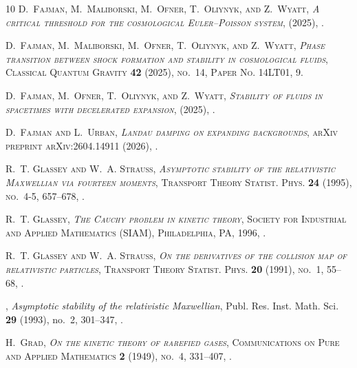 \documentclass[reqno]{amsart}
\theoremstyle{definition}
\numberwithin{equation}{section}
\numberwithin{theorem}{section}
\begin{document}
\begin{thebibliography}{10}
\bgroup\scshape{}D.~Fajman\egroup{}, \bgroup\scshape{}M.~Maliborski\egroup{}, \bgroup\scshape{}M.~Ofner\egroup{}, \bgroup\scshape{}T.~Oliynyk\egroup{}, and \bgroup\scshape{}Z.~Wyatt\egroup{}, \emph{A critical threshold for the cosmological {E}uler--{P}oisson system},  (2025), .

\bgroup\scshape{}D.~Fajman\egroup{}, \bgroup\scshape{}M.~Maliborski\egroup{}, \bgroup\scshape{}M.~Ofner\egroup{}, \bgroup\scshape{}T.~Oliynyk\egroup{}, and \bgroup\scshape{}Z.~Wyatt\egroup{}, \emph{Phase transition between shock formation and stability in cosmological fluids}, Classical Quantum Gravity \textbf{42} (2025), no.~14, Paper No. 14LT01, 9.

\bgroup\scshape{}D.~Fajman\egroup{}, \bgroup\scshape{}M.~Ofner\egroup{}, \bgroup\scshape{}T.~Oliynyk\egroup{}, and \bgroup\scshape{}Z.~Wyatt\egroup{}, \emph{Stability of fluids in spacetimes with decelerated expansion},  (2025), .

\bgroup\scshape{}D.~Fajman\egroup{} and \bgroup\scshape{}L.~Urban\egroup{}, \emph{Landau damping on expanding backgrounds}, arXiv preprint arXiv:2604.14911 (2026), .

\bgroup\scshape{}R.~T. Glassey\egroup{} and \bgroup\scshape{}W.~A. Strauss\egroup{}, \emph{Asymptotic stability of the relativistic {M}axwellian via fourteen moments}, Transport Theory Statist. Phys. \textbf{24} (1995), no.~4-5, 657--678, .

\bgroup\scshape{}R.~T. Glassey\egroup{}, \emph{The {C}auchy problem in kinetic theory}, Society for Industrial and Applied Mathematics (SIAM), Philadelphia, PA, 1996, .

\bgroup\scshape{}R.~T. Glassey\egroup{} and \bgroup\scshape{}W.~A. Strauss\egroup{}, \emph{On the derivatives of the collision map of relativistic particles}, Transport Theory Statist. Phys. \textbf{20} (1991), no.~1, 55--68, .

\bysame, \emph{Asymptotic stability of the relativistic {M}axwellian}, Publ. Res. Inst. Math. Sci. \textbf{29} (1993), no.~2, 301--347, .

\bgroup\scshape{}H.~Grad\egroup{}, \emph{On the kinetic theory of rarefied gases}, Communications on Pure and Applied Mathematics \textbf{2} (1949), no.~4, 331--407, .


\end{thebibliography}
\end{document}
